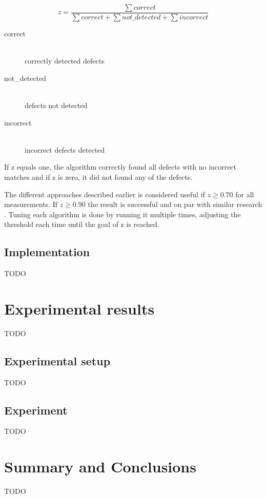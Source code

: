 \documentclass[a4paper,12pt]{article}
\begin{document}
$$z = \frac{\sum correct}{\sum correct + \sum not\_detected + \sum incorrect}$$
\begin{description}
  \item[correct] \hfill \\
  		correctly detected defects
  \item[not\_detected] \hfill \\
  		defects not detected
  \item[incorrect] \hfill \\
   		incorrect defects detected
\end{description}

If z equals one, the algorithm correctly found all defects with no incorrect matches and if z is zero, it did not found any of the defects.

The different approaches described earlier is considered useful if $z \geq 0.70$ for all measurements. If $z \geq 0.90$ the result is successful and on par with similar research \cite{frunza2006automatic, frunzaInkpen2009identification}. Tuning each algorithm is done by running it multiple times, adjusting the threshold each time until the goal of z is reached.


\subsection{Implementation}
\label{sec:implementation}
TODO

\section{Experimental results}
\label{sec:experimentalresults}
TODO

\subsection{Experimental setup}
TODO

\subsection{Experiment}
TODO

\section{Summary and Conclusions}
\label{sec:summary}
TODO




\end{document}
